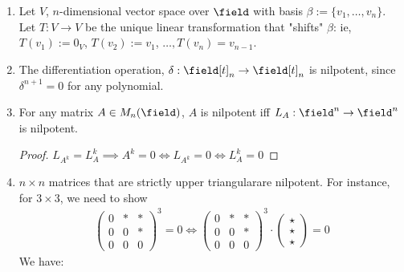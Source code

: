 
\begin{example}
    \begin{enumerate}
        \item Let $V$, $n$-dimensional vector space over $\field$ with basis $\beta := \{v_1, \dots, v_n\}$. Let $T: V \to V$ be the unique linear transformation that "shifts" $\beta$: ie, $T(v_1) := 0_V$, $T(v_2) := v_1$, $\dots, T(v_n)  = v_{n-1}$.
        \item The differentiation operation, $\delta : \field[t]_n \to \field[t]_n$ is nilpotent, since $\delta^{n+1} = 0$ for any polynomial.
        \item For any matrix $A \in M_{n}(\field)$, $A$ is nilpotent iff $L_A : \field^n \to \field^n$ is nilpotent.
        \begin{proof}
            $L_{A^k} = L_A^k \implies A^k = 0 \iff L_{A^k}= 0 \iff L_{A}^k = 0$
        \end{proof}
        \item $n \times n$ matrices that are strictly upper triangular\footnotemark are nilpotent. For instance, for $3 \times 3$, we need to show\footnotemark
        \begin{align*}
            \begin{pmatrix}
                0 & \ast &\ast\\
                0 & 0 & \ast\\
                0 & 0 & 0
            \end{pmatrix}^3 = 0 \iff \begin{pmatrix}
                0 & \ast &\ast\\
                0 & 0 & \ast\\
                0 & 0 & 0
            \end{pmatrix}^3\cdot \begin{pmatrix}
                \star\\
                \star\\
                \star
            \end{pmatrix} = 0
        \end{align*}
        We have:
        \begin{align*}

\end{align*}
\end{enumerate}
\end{example}
